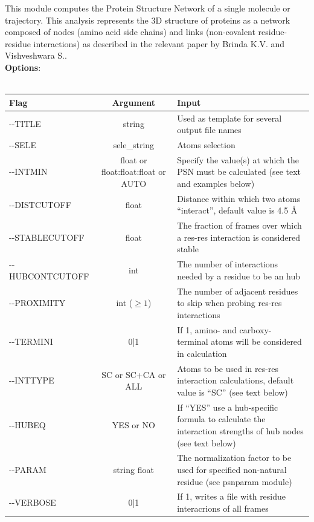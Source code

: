 \documentclass[11pt,twoside,onecolumn,a4paper,openright,notitlepage]{book}[2001/04/21]
\begin{document}
This module computes the Protein Structure Network of a single molecule or trajectory.
This analysis represents the 3D structure of proteins as a network composed of nodes (amino acid side
chains) and links (non-covalent residue-residue interactions) as described in the relevant paper by
Brinda K.V. and Vishveshwara S.\cite{brinda05}.\\

\textbf{\large Options}:\\\\
\begin{tabular}{l|c|p{7.0cm}}
Flag & Argument & Input \\
\hline
-{}-TITLE         & string                                 & Used as template for several output file names\\
-{}-SELE          & sele\_string                           & Atoms selection\\
-{}-INTMIN        & \parbox[t]{3cm}{float or float:float:float or AUTO} & Specify the value(s) at which the PSN must be calculated (see text and examples below)\\
-{}-DISTCUTOFF    & float                                  & Distance within which two atoms ``interact'', default value is 4.5 \AA{}\\
-{}-STABLECUTOFF  & float                                  & The fraction of frames over which a res-res interaction is considered stable\\
-{}-HUBCONTCUTOFF & int                                    & The number of interactions needed by a residue to be an hub\\
-{}-PROXIMITY     & int ($\ge{1}$)                         & The number of adjacent residues to skip when probing res-res interactions\\
-{}-TERMINI       & 0|1                                    & If 1, amino- and carboxy- terminal atoms will be considered in calculation\\
-{}-INTTYPE       & \parbox[t]{3cm}{SC or SC+CA or ALL}    & Atoms to be used in res-res interaction calculations, default value is ``SC'' (see text below)\\
-{}-HUBEQ         & YES or NO                              & If ``YES'' use a hub-specific formula to calculate the interaction strengths of hub nodes (see text below)\\
-{}-PARAM         & string float                           & The normalization factor to be used for specified non-natural residue (see psnparam module)\\
-{}-VERBOSE       & 0|1                                    & If 1, writes a file with residue interacrions of all frames\\
\end{tabular}\\\\
\end{document}
